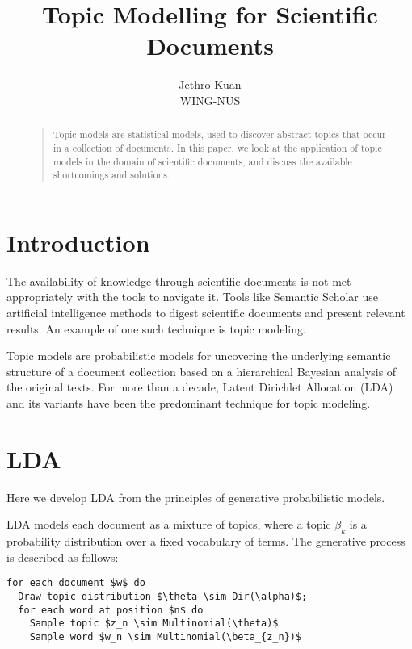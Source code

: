 \documentclass[letterpaper]{article}
\begin{document}
\nocopyright


\title{Topic Modelling for Scientific Documents}
\author{Jethro Kuan \\
  WING-NUS\\
}
\maketitle
\begin{abstract}
  \begin{quote}
    Topic models are statistical models, used to discover abstract
    topics that occur in a collection of documents. In this paper, we
    look at the application of topic models in the domain of
    scientific documents, and discuss the available shortcomings and
    solutions.
  \end{quote}
\end{abstract}

\section{Introduction}
The availability of knowledge through scientific documents is not met
appropriately with the tools to navigate it. Tools like Semantic
Scholar use artificial intelligence methods to digest scientific
documents and present relevant results. An example of one such
technique is topic modeling.

Topic models are probabilistic models for uncovering the underlying
semantic structure of a document collection based on a hierarchical
Bayesian analysis of the original texts. For more than a decade,
Latent Dirichlet Allocation (LDA) and its variants have been the
predominant technique for topic modeling.

\section{LDA}
Here we develop LDA from the principles of generative probabilistic
models.

LDA models each document as a mixture of topics, where a topic $\beta_k$ is
a probability distribution over a fixed vocabulary of terms. The
generative process is described as follows:

\begin{lstlisting}[mathescape=true]
for each document $w$ do
  Draw topic distribution $\theta \sim Dir(\alpha)$;
  for each word at position $n$ do
    Sample topic $z_n \sim Multinomial(\theta)$
    Sample word $w_n \sim Multinomial(\beta_{z_n})$
\end{lstlisting}
\end{document}
